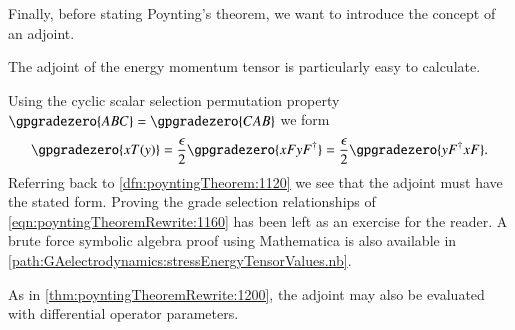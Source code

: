 Finally, before stating Poynting's theorem, we want to introduce the concept of an adjoint.


The adjoint of the energy momentum tensor is particularly easy to calculate.

Using
the cyclic scalar selection permutation property \(\gpgradezero{ABC} = \gpgradezero{CAB}\) we form
\begin{dmath}\label{eqn:poyntingTheoremRewrite:1160}
\gpgradezero{ x T(y) }
=
\frac{\epsilon}{2} \gpgradezero{ x F y F^\dagger }
=
\frac{\epsilon}{2} \gpgradezero{ y F^\dagger x F }.
\end{dmath}
Referring back to \cref{dfn:poyntingTheorem:1120} we see that the adjoint must have the stated form.
Proving the grade selection relationships of \cref{eqn:poyntingTheoremRewrite:1160} has been left as
an exercise for the reader.  A brute force symbolic algebra proof using Mathematica is also available in \cref{path:GAelectrodynamics:stressEnergyTensorValues.nb}.

As in \cref{thm:poyntingTheoremRewrite:1200},
the adjoint may also be evaluated with differential operator parameters.


